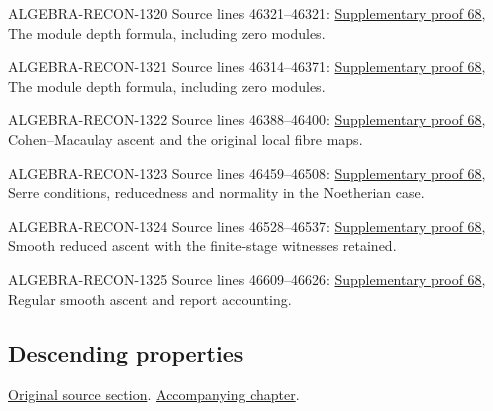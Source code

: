 \begin{AlgebraSourceRoutes}
\item[ALGEBRA-RECON-1320] Source lines 46321--46321: \hyperlink{algebra_ascent_notes_20260929}{Supplementary proof 68}, The module depth formula, including zero modules.
\item[ALGEBRA-RECON-1321] Source lines 46314--46371: \hyperlink{algebra_ascent_notes_20260929}{Supplementary proof 68}, The module depth formula, including zero modules.
\item[ALGEBRA-RECON-1322] Source lines 46388--46400: \hyperlink{algebra_ascent_notes_20260929}{Supplementary proof 68}, Cohen–Macaulay ascent and the original local fibre maps.
\item[ALGEBRA-RECON-1323] Source lines 46459--46508: \hyperlink{algebra_ascent_notes_20260929}{Supplementary proof 68}, Serre conditions, reducedness and normality in the Noetherian case.
\item[ALGEBRA-RECON-1324] Source lines 46528--46537: \hyperlink{algebra_ascent_notes_20260929}{Supplementary proof 68}, Smooth reduced ascent with the finite-stage witnesses retained.
\item[ALGEBRA-RECON-1325] Source lines 46609--46626: \hyperlink{algebra_ascent_notes_20260929}{Supplementary proof 68}, Regular smooth ascent and report accounting.
\end{AlgebraSourceRoutes}

\subsection{Descending properties}
\hypertarget{algebra-source-section-descending-properties}{}
\noindent\href{https://github.com/stacks/stacks-project/blob/a04446e57ec1fbc252a871afcec7752fb2807b14/algebra.tex\#L46633}{Original source section}. \href{algebra.pdf\#nameddest=section-descending-properties}{Accompanying chapter}.

